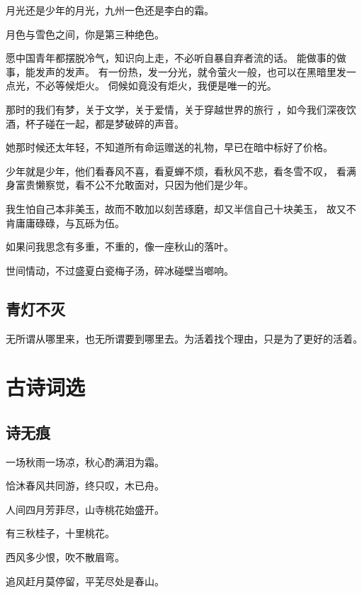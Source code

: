 \documentclass[UTF8,oneside]{ctexbook}
\begin{document}
\mfApache \quad 月光还是少年的月光，九州一色还是李白的霜。

\mfApache \quad 月色与雪色之间，你是第三种绝色。

\mfApache \quad 愿中国青年都摆脱冷气，知识向上走，不必听自暴自弃者流的话。
能做事的做事，能发声的发声。
有一份热，发一分光，就令萤火一般，也可以在黑暗里发一点光，不必等候炬火。
伺候如竟没有炬火，我便是唯一的光。

\mfApache \quad 那时的我们有梦，关于文学，关于爱情，关于穿越世界的旅行
，如今我们深夜饮酒，杯子碰在一起，都是梦破碎的声音。

\mfApache \quad 她那时候还太年轻，不知道所有命运赠送的礼物，早已在暗中标好了价格。

\mfApache \quad 少年就是少年，他们看春风不喜，看夏蝉不烦，看秋风不悲，看冬雪不叹，
看满身富贵懒察觉，看不公不允敢面对，只因为他们是少年。

\mfApache \quad 我生怕自己本非美玉，故而不敢加以刻苦琢磨，却又半信自己十块美玉，
故又不肯庸庸碌碌，与瓦砾为伍。

\mfApache \quad 如果问我思念有多重，不重的，像一座秋山的落叶。

\mfApache \quad 世间情动，不过盛夏白瓷梅子汤，碎冰碰壁当啷响。

\mfApache \quad 

\section{青灯不灭}
\mfApache \quad 
无所谓从哪里来，也无所谓要到哪里去。为活着找个理由，只是为了更好的活着。

\chapter{古诗词选}
\section{诗无痕}
\mfApache \quad 一场秋雨一场凉，秋心酌满泪为霜。

\mfApache \quad 恰沐春风共同游，终只叹，木已舟。

\mfApache \quad 人间四月芳菲尽，山寺桃花始盛开。

\mfApache \quad 有三秋桂子，十里桃花。

\mfApache \quad 西风多少恨，吹不散眉弯。

\mfApache \quad 追风赶月莫停留，平芜尽处是春山。

\mfApache \quad 
\end{document}
